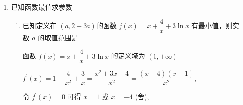 \begin{enumerate}
\begin{enumerate}
\begin{jieda}
\begin{enumerate}
                可得 $f\left( 0\right)  = 2,{f}^{\prime }\left( 0\right)  = 2$ ,
                
                即切点坐标为 $\left( {0,2}\right)$ ,切线斜率为 $k = 2$ ,
                
                所以切线方程为 $y = {2x} + 2$ .
                \item 由 (1) 可得 ${f}^{\prime }\left( x\right)  = 2{{e}}^{2x} + {{e}}^{x} - 1 = \left( {{{e}}^{x} + 1}\right) \left( {2{{e}}^{x} - 1}\right)$ ,
                
                且 $x \in  \left\lbrack  {-1,0}\right\rbrack$ ,则 ${{e}}^{x} + 1 > 0$ ,
                
                令 ${f}^{\prime }\left( x\right)  > 0$ ，则 $2{{e}}^{x} - 1 > 0$ ，解得 $- \ln 2 < x \leq  0$ ；
                
                令 ${f}^{\prime }\left( x\right)  < 0$ ，则 $2{{e}}^{x} - 1 < 0$ ，解得 $- 1 \leq  x <  - \ln 2$ ；
                
                可知 $f\left( x\right)$ 在 $\lbrack  - 1, - \ln 2)$ 内单调递减,在 $( - \ln 2,0\rbrack$ 内单调递增,
                
                又因为 $f\left( {-1}\right)  = \dfrac{1 + {e} - {{e}}^{2}}{{{e}}^{2}},f\left( 0\right)  = 2,f\left( {-\ln 2}\right)  = \dfrac{3}{4} + \ln 2$ ,且 $\dfrac{1 + {e} - {{e}}^{2}}{{{e}}^{2}} < 2$ ,
                
                所以函数 $f\left( x\right)$ 的最大值为 2,最小值 $\dfrac{3}{4} + \ln 2$ .
            \end{enumerate}
        \end{jieda} 
    \end{enumerate}
    \item 已知函数最值求参数
    \begin{enumerate}
        \item 已知定义在 $\left( {a,2 - {3a}}\right)$的函数 $f\left( x\right)  = x + \dfrac{4}{x} + 3\ln x$ 有最小值，则实数 $a$ 的取值范围是
        \begin{jieda}
            函数 $f\left( x\right)  = x + \dfrac{4}{x} + 3\ln x$ 的定义域为 $\left( {0, + \infty }\right)$
            
            ${f}^{\prime }\left( x\right)  = 1 - \dfrac{4}{{x}^{2}} + \dfrac{3}{x} = \dfrac{{x}^{2} + {3x} - 4}{{x}^{2}} = \dfrac{\left( {x + 4}\right) \left( {x - 1}\right) }{{x}^{2}},$
            
            令 ${f}^{\prime }\left( x\right)  = 0$ 可得 $x = 1$ 或 $x =  - 4$ (舍),
            

\end{jieda}
\end{enumerate}
\end{enumerate}
